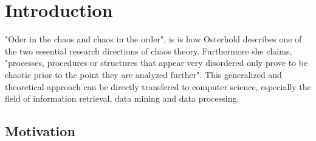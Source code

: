 
\chapter{Introduction\label{cha:chapter1}}

"Oder in the chaos and chaos in the order", is is how Osterhold
describes one of the two essential research directions of chaos theory. Furthermore she claims, "processes, procedures or structures that appear very disordered only prove to be chaotic prior to the point they are analyzed further".
This generalized and theoretical approach can be directly transfered to computer science, especially the field of information retrieval, data mining and data processing. 

\section{Motivation\label{sec:moti}}

